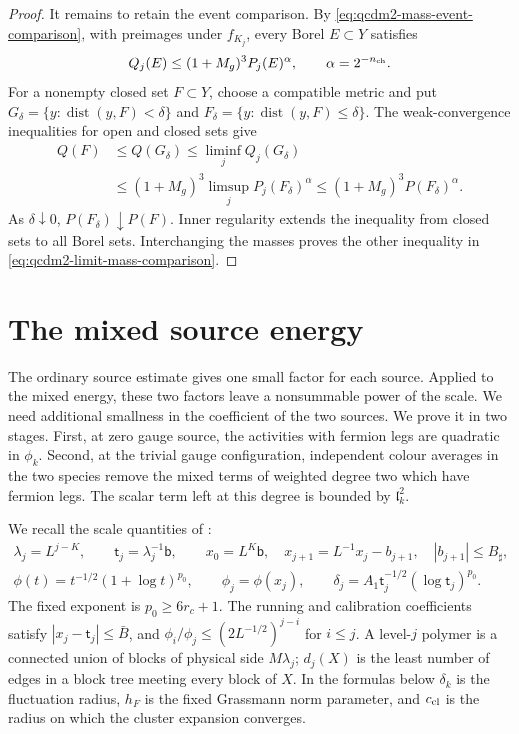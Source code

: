 \documentclass[11pt,letterpaper,reqno]{amsart}
\theoremstyle{definition}
\theoremstyle{remark}
\begin{document}
\begin{proof}
It remains to retain the event comparison. By
\eqref{eq:qcdm2-mass-event-comparison}, with preimages under
$f_{K_j}$, every Borel $E\subset Y$ satisfies
\[
 Q_j(E)\le(1+M_g)^3P_j(E)^\alpha,
 \qquad \alpha=2^{-n_{\rm ch}}.
\]
For a nonempty closed set $F\subset Y$, choose a compatible
metric and put $G_\delta=\{y:\operatorname{dist}(y,F)<\delta\}$
and $F_\delta=\{y:\operatorname{dist}(y,F)\le\delta\}$.
The weak-convergence inequalities for open and closed sets give
\[
 \begin{split}
 Q(F)&\le Q(G_\delta)
      \le\liminf_j Q_j(G_\delta)\\
 &\le(1+M_g)^3\limsup_j P_j(F_\delta)^\alpha
      \le(1+M_g)^3P(F_\delta)^\alpha.
 \end{split}
\]
As $\delta\downarrow0$, $P(F_\delta)\downarrow P(F)$.
Inner regularity extends the inequality from closed sets
to all Borel sets. Interchanging the masses proves the
other inequality in \eqref{eq:qcdm2-limit-mass-comparison}.
\end{proof}


\section{The mixed source energy}
\label{sec:qcdm2-mixed-proof}

The ordinary source estimate gives one small factor for each
source.  Applied to the mixed energy, these two factors leave a
nonsummable power of the scale.  We need additional smallness in
the coefficient of the two sources.  We prove it in two stages.
First, at zero gauge source, the activities with fermion legs are
quadratic in $\phi_k$.  Second, at the trivial gauge configuration,
independent colour averages in the two species remove the mixed
terms of weighted degree two which have fermion legs.  The scalar
term left at this degree is bounded by $\mathfrak l_k^2$.

We recall the scale quantities of \cite[\S4]{QCDM1}:
\[
 \begin{gathered}
 \lambda_j=L^{j-K},\qquad \mathsf t_j=\lambda_j^{-1}\mathsf b,
 \qquad x_0=L^K\mathsf b,\quad
 x_{j+1}=L^{-1}x_j-b_{j+1},\quad |b_{j+1}|\le B_\sharp,\\
 \phi(t)=t^{-1/2}(1+\log t)^{p_0},\qquad
 \phi_j=\phi(x_j),\qquad
 \delta_j=A_1\mathsf t_j^{-1/2}(\log\mathsf t_j)^{p_0}.
 \end{gathered}
\]
The fixed exponent is $p_0\ge6r_c+1$.
The running and calibration coefficients satisfy
$|x_j-\mathsf t_j|\le\bar B$, and
$\phi_i/\phi_j\le(2L^{-1/2})^{j-i}$ for $i\le j$.
A level-$j$ polymer is a connected union of blocks of physical
side $M\lambda_j$; $d_j(X)$ is the least number of edges in
a block tree meeting every block of $X$. In the formulas
below $\delta_k$ is the fluctuation radius, $h_F$ is the
fixed Grassmann norm parameter, and $c_{\rm cl}$ is the
radius on which the cluster expansion converges.
\end{document}
